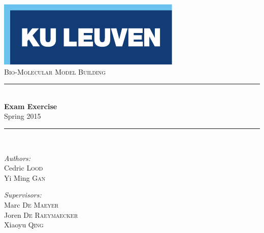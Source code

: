 \begin{titlepage}
  \begin{center}
    
    \includegraphics[scale=1.5]{Figures/kuleuven_logo.pdf}~\\[4.5cm]
    
    \textsc{\Large Bio-Molecular Model Building}\\[0.5cm]
    
    \rule{\linewidth}{0.3mm}\\[0.4cm]
    {\huge \bfseries Exam Exercise} \\[0.4cm]
    {\large Spring 2015} \\[0.4cm]
    \rule{\linewidth}{0.3mm}\\[1.5cm]
    
    \begin{minipage}{0.4\textwidth}
      \begin{flushleft} \large
        \emph{Authors:}\\
        Cedric \textsc{Lood}\\
        Yi Ming \textsc{Gan}\\
      \end{flushleft}
    \end{minipage}
    \begin{minipage}{0.4\textwidth}
      \begin{flushright} \large
        \emph{Supervisors:} \\
        Marc \textsc{De Maeyer}\\
        Joren \textsc{De Raeymaecker}\\
        Xiaoyu \textsc{Qing}
      \end{flushright}
    \end{minipage}
    
    \vfill
    

\end{center}
\end{titlepage}
